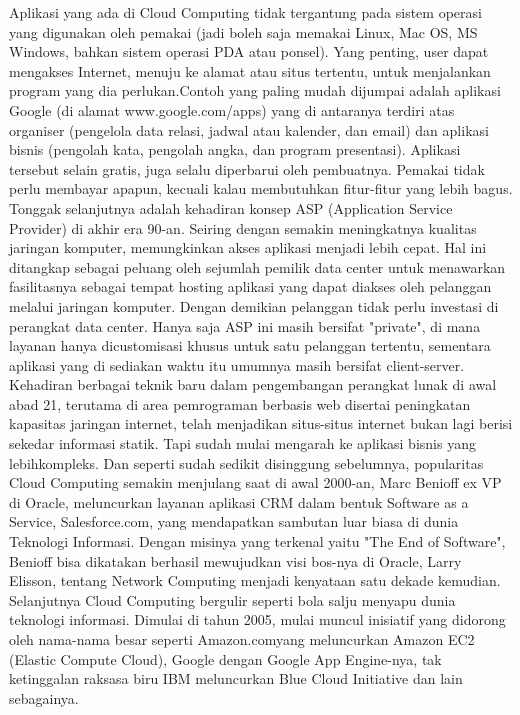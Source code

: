 \tab Aplikasi yang ada di Cloud Computing tidak tergantung pada sistem operasi yang digunakan oleh pemakai (jadi boleh saja memakai Linux, Mac OS, MS Windows, bahkan sistem operasi PDA atau ponsel). Yang penting, user dapat mengakses Internet, menuju ke alamat atau situs tertentu, untuk menjalankan program yang dia perlukan.Contoh yang paling mudah dijumpai adalah aplikasi Google (di alamat www.google.com/apps) yang di antaranya terdiri atas organiser (pengelola data relasi, jadwal atau kalender, dan email) dan aplikasi bisnis (pengolah kata, pengolah angka, dan program presentasi). Aplikasi tersebut selain gratis, juga selalu diperbarui oleh pembuatnya. Pemakai tidak perlu membayar apapun, kecuali kalau membutuhkan fitur-fitur yang lebih bagus. \\Tonggak selanjutnya adalah kehadiran konsep ASP (Application Service Provider) di akhir era 90-an. Seiring dengan semakin meningkatnya kualitas jaringan komputer, memungkinkan akses aplikasi menjadi lebih cepat. Hal ini ditangkap sebagai peluang oleh sejumlah pemilik data center untuk menawarkan fasilitasnya sebagai tempat hosting aplikasi yang dapat diakses oleh pelanggan melalui jaringan komputer. Dengan demikian pelanggan tidak perlu investasi di perangkat data center. Hanya saja ASP ini masih bersifat "private", di mana layanan hanya dicustomisasi khusus untuk satu pelanggan tertentu, sementara aplikasi yang di sediakan waktu itu umumnya masih bersifat client-server. \\Kehadiran berbagai teknik baru dalam pengembangan perangkat lunak di awal abad 21, terutama di area pemrograman berbasis web disertai peningkatan kapasitas jaringan internet, telah menjadikan situs-situs internet bukan lagi berisi sekedar informasi statik. Tapi sudah mulai mengarah ke aplikasi bisnis yang lebihkompleks. Dan seperti sudah sedikit disinggung sebelumnya, popularitas Cloud Computing semakin menjulang saat di awal 2000-an, Marc Benioff ex VP di Oracle, meluncurkan layanan aplikasi CRM dalam bentuk Software as a Service, Salesforce.com, yang mendapatkan sambutan luar biasa di dunia Teknologi Informasi. Dengan misinya yang terkenal yaitu "The End of Software", Benioff bisa dikatakan berhasil mewujudkan visi bos-nya di Oracle, Larry Elisson, tentang Network Computing menjadi kenyataan satu dekade kemudian. Selanjutnya Cloud Computing bergulir seperti bola salju menyapu dunia teknologi informasi. Dimulai di tahun 2005, mulai muncul inisiatif yang didorong oleh nama-nama besar seperti Amazon.comyang meluncurkan Amazon EC2 (Elastic Compute Cloud), Google dengan Google App Engine-nya, tak ketinggalan raksasa biru IBM meluncurkan Blue Cloud Initiative dan lain sebagainya. 
